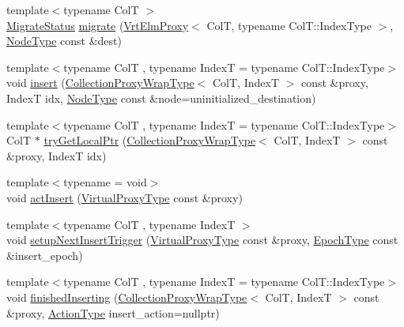 \begin{DoxyCompactItemize}
\item 
{\footnotesize template$<$typename ColT $>$ }\\\hyperlink{namespacevt_1_1vrt_1_1collection_ad221ad8aea9e586689b4335f5bcd9804}{Migrate\+Status} \hyperlink{structvt_1_1vrt_1_1collection_1_1_collection_manager_a195df30bb149ade0000c5c5118b57d87}{migrate} (\hyperlink{structvt_1_1vrt_1_1collection_1_1_vrt_elm_proxy}{Vrt\+Elm\+Proxy}$<$ ColT, typename Col\+T\+::\+Index\+Type $>$, \hyperlink{namespacevt_a866da9d0efc19c0a1ce79e9e492f47e2}{Node\+Type} const \&dest)
\item 
{\footnotesize template$<$typename ColT , typename IndexT  = typename Col\+T\+::\+Index\+Type$>$ }\\void \hyperlink{structvt_1_1vrt_1_1collection_1_1_collection_manager_af7c0033bd57a7dbb3e70888e7fb2e1a9}{insert} (\hyperlink{structvt_1_1vrt_1_1collection_1_1_collection_manager_a56458ed7f9bb22b631b9b3a745f42f94}{Collection\+Proxy\+Wrap\+Type}$<$ ColT, IndexT $>$ const \&proxy, IndexT idx, \hyperlink{namespacevt_a866da9d0efc19c0a1ce79e9e492f47e2}{Node\+Type} const \&node=uninitialized\+\_\+destination)
\item 
{\footnotesize template$<$typename ColT , typename IndexT  = typename Col\+T\+::\+Index\+Type$>$ }\\ColT $\ast$ \hyperlink{structvt_1_1vrt_1_1collection_1_1_collection_manager_a09bd0e2b03bd5f638bdc44f7ffeef715}{try\+Get\+Local\+Ptr} (\hyperlink{structvt_1_1vrt_1_1collection_1_1_collection_manager_a56458ed7f9bb22b631b9b3a745f42f94}{Collection\+Proxy\+Wrap\+Type}$<$ ColT, IndexT $>$ const \&proxy, IndexT idx)
\item 
{\footnotesize template$<$typename  = void$>$ }\\void \hyperlink{structvt_1_1vrt_1_1collection_1_1_collection_manager_aba521bf30580ffe5a815b5e50bfbcbfe}{act\+Insert} (\hyperlink{namespacevt_a1b417dd5d684f045bb58a0ede70045ac}{Virtual\+Proxy\+Type} const \&proxy)
\item 
{\footnotesize template$<$typename ColT , typename IndexT $>$ }\\void \hyperlink{structvt_1_1vrt_1_1collection_1_1_collection_manager_a1d93ed0d843deb241d788c305033b9e0}{setup\+Next\+Insert\+Trigger} (\hyperlink{namespacevt_a1b417dd5d684f045bb58a0ede70045ac}{Virtual\+Proxy\+Type} const \&proxy, \hyperlink{namespacevt_a985a5adf291c34a3ca263b3378388236}{Epoch\+Type} const \&insert\+\_\+epoch)
\item 
{\footnotesize template$<$typename ColT , typename IndexT  = typename Col\+T\+::\+Index\+Type$>$ }\\void \hyperlink{structvt_1_1vrt_1_1collection_1_1_collection_manager_a54edc9079585574858ecf512761f8efc}{finished\+Inserting} (\hyperlink{structvt_1_1vrt_1_1collection_1_1_collection_manager_a56458ed7f9bb22b631b9b3a745f42f94}{Collection\+Proxy\+Wrap\+Type}$<$ ColT, IndexT $>$ const \&proxy, \hyperlink{namespacevt_ae0a5a7b18cc99d7b732cb4d44f46b0f3}{Action\+Type} insert\+\_\+action=nullptr)

\end{DoxyCompactItemize}
